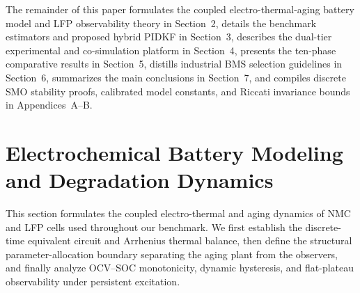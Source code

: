 \documentclass[10pt,a4paper]{article}
\begin{document}
The remainder of this paper formulates the coupled electro-thermal-aging battery model and LFP observability theory in Section~2, details the benchmark estimators and proposed hybrid PIDKF in Section~3, describes the dual-tier experimental and co-simulation platform in Section~4, presents the ten-phase comparative results in Section~5, distills industrial BMS selection guidelines in Section~6, summarizes the main conclusions in Section~7, and compiles discrete SMO stability proofs, calibrated model constants, and Riccati invariance bounds in Appendices~A--B.

\section{Electrochemical Battery Modeling and Degradation Dynamics}
This section formulates the coupled electro-thermal and aging dynamics of NMC and LFP cells used throughout our benchmark. We first establish the discrete-time equivalent circuit and Arrhenius thermal balance, then define the structural parameter-allocation boundary separating the aging plant from the observers, and finally analyze OCV--SOC monotonicity, dynamic hysteresis, and flat-plateau observability under persistent excitation.
\end{document}
